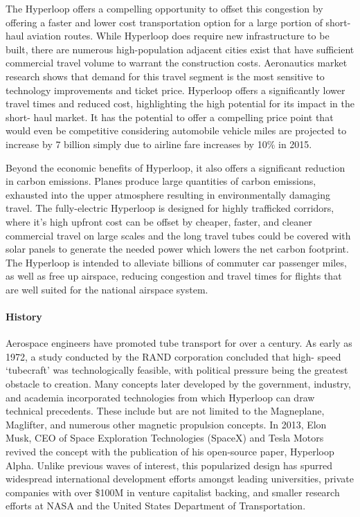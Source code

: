 	The Hyperloop offers a compelling opportunity to offset this congestion by
	offering a faster and lower cost transportation option for a large portion
	of short-haul aviation routes. While Hyperloop does require new
	infrastructure to be built, there are numerous high-population adjacent
	cities exist that have sufficient commercial travel volume to warrant the
	construction costs. Aeronautics market research shows that demand for this
	travel segment is the most sensitive to technology improvements and ticket
	price.\cite{Baik} Hyperloop offers a significantly lower travel times and
	reduced cost, highlighting the high potential for its impact in the short-
	haul market. It has the potential to offer a compelling price point that
	would even be competitive considering automobile vehicle miles are
	projected to increase by 7 billion simply due to airline fare increases by
	10\% in 2015.

	Beyond the economic benefits of Hyperloop, it also offers a significant
	reduction in carbon emissions. Planes produce large quantities of carbon
	emissions, exhausted into the upper atmosphere resulting in
	environmentally damaging travel. The fully-electric Hyperloop is designed
	for highly trafficked corridors, where it's high upfront cost can be
	offset by cheaper, faster, and cleaner commercial travel on large scales
	and the long travel tubes could be covered with solar panels to generate
	the needed power which lowers the net carbon footprint. The Hyperloop is
	intended to alleviate billions of commuter car passenger miles, as well as
	free up airspace, reducing congestion and travel times for flights that
	are well suited for the national airspace system.\\

\paragraph{History}

	Aerospace engineers have promoted tube transport for over a century.
	As early as 1972, a study conducted by the RAND corporation concluded that high-
	speed `tubecraft' was technologically feasible, with political pressure being the greatest
	obstacle to creation.\cite{RAND} Many concepts later developed by
	the government, industry, and academia incorporated technologies from which
	Hyperloop can draw technical precedents.
	These include but are not limited to the Magneplane, Maglifter, and numerous
	other magnetic propulsion concepts. In 2013, Elon Musk, CEO of Space Exploration
	Technologies (SpaceX) and Tesla Motors revived the concept with the publication
	of his open-source paper, Hyperloop Alpha.\cite{Musk}
	Unlike previous waves of interest, this popularized design has spurred widespread international
	development efforts amongst leading universities, private companies with over
	\$100M in venture capitalist backing, and smaller research efforts at NASA and the
	United States Department of Transportation. \cite{Chin}

